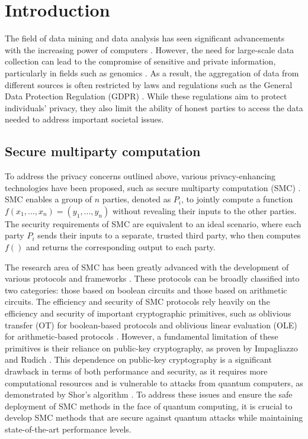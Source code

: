 


%

\chapter{Introduction}

The field of data mining and data analysis has seen significant advancements with the increasing power of computers \cite{Wang11}. However, the need for large-scale data collection can lead to the compromise of sensitive and private information, particularly in fields such as genomics \cite{NS08, L02, Homer08, Gymrek13}. As a result, the aggregation of data from different sources is often restricted by laws and regulations such as the General Data Protection Regulation (GDPR) \cite{EUdataregulations2016}. While these regulations aim to protect individuals' privacy, they also limit the ability of honest parties to access the data needed to address important societal issues.

\section*{Secure multiparty computation}


To address the privacy concerns outlined above, various privacy-enhancing technologies have been proposed, such as secure multiparty computation (SMC) \cite{Li2016, Armknecht2015, Yao82}. SMC enables a group of $n$ parties, denoted as $P_i$, to jointly compute a function $f( x_1, ..., x_n ) = (y_1, ..., y_n)$ without revealing their inputs to the other parties. The security requirements of SMC are equivalent to an ideal scenario, where each party $P_i$ sends their inputs to a separate, trusted third party, who then computes $f()$ and returns the corresponding output to each party.

The research area of SMC has been greatly advanced with the development of various protocols and frameworks \cite{Goldreich87, Bendlin11, D12}. These protocols can be broadly classified into two categories: those based on boolean circuits and those based on arithmetic circuits. The efficiency and security of SMC protocols rely heavily on the efficiency and security of important cryptographic primitives, such as oblivious transfer (OT) for boolean-based protocols and oblivious linear evaluation (OLE) for arithmetic-based protocols \citep{Yao82, KOS16}. However, a fundamental limitation of these primitives is their reliance on public-key cryptography, as proven by Impagliazzo and Rudich \cite{IR99}. This dependence on public-key cryptography is a significant drawback in terms of both performance and security, as it requires more computational resources and is vulnerable to attacks from quantum computers, as demonstrated by Shor's algorithm \cite{Sho95}. To address these issues and ensure the safe deployment of SMC methods in the face of quantum computing, it is crucial to develop SMC methods that are secure against quantum attacks while maintaining state-of-the-art performance levels.


